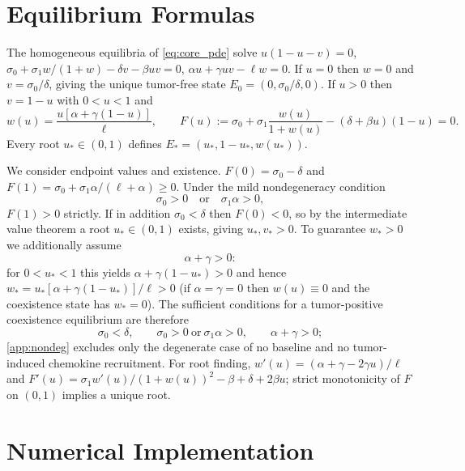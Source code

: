 \documentclass[]{interact}
\theoremstyle{plain}%
\theoremstyle{definition}
\theoremstyle{remark}
\begin{document}
\section{Equilibrium Formulas}\label{app:equilibria}
The homogeneous equilibria of \eqref{eq:core_pde} solve $u(1-u-v)=0$,
$\sigma_0+\sigma_1 w/(1+w)-\delta v-\beta uv=0$, $\alpha u+\gamma uv-\ell w=0$.
If $u=0$ then $w=0$ and $v=\sigma_0/\delta$, giving the unique tumor-free state
$E_0=(0,\sigma_0/\delta,0)$. If $u>0$ then $v=1-u$ with $0<u<1$ and
\[
w(u)=\frac{u[\alpha+\gamma(1-u)]}{\ell},\qquad
F(u):=\sigma_0+\sigma_1\frac{w(u)}{1+w(u)}-(\delta+\beta u)(1-u)=0 .
\]
Every root $u_*\in(0,1)$ defines $E_*=(u_*,1-u_*,w(u_*))$.

We consider endpoint values and existence. $F(0)=\sigma_0-\delta$ and
$F(1)=\sigma_0+\sigma_1\alpha/(\ell+\alpha)\ge0$. Under the mild nondegeneracy
condition
\begin{equation}\label{app:nondeg}
\sigma_0>0\quad\text{or}\quad\sigma_1\alpha>0,
\end{equation}
$F(1)>0$ strictly. If in addition $\sigma_0<\delta$ then $F(0)<0$, so by the
intermediate value theorem a root $u_*\in(0,1)$ exists, giving $u_*,v_*>0$. To
guarantee $w_*>0$ we additionally assume
\begin{equation}\label{app:wpos}
\alpha+\gamma>0 :
\end{equation}
for $0<u_*<1$ this yields $\alpha+\gamma(1-u_*)>0$ and hence
$w_*=u_*[\alpha+\gamma(1-u_*)]/\ell>0$ (if $\alpha=\gamma=0$ then $w(u)\equiv0$
and the coexistence state has $w_*=0$). The sufficient conditions for a
tumor-positive coexistence equilibrium are therefore
\[
\sigma_0<\delta,\qquad
\sigma_0>0\ \text{or}\ \sigma_1\alpha>0,\qquad
\alpha+\gamma>0;
\]
\eqref{app:nondeg} excludes only the degenerate case of no baseline and no
tumor-induced chemokine recruitment. For
root finding, $w'(u)=(\alpha+\gamma-2\gamma u)/\ell$ and
$F'(u)=\sigma_1 w'(u)/(1+w(u))^2-\beta+\delta+2\beta u$; strict monotonicity of
$F$ on $(0,1)$ implies a unique root.

\section{Numerical Implementation}\label{app:numerics}
\end{document}
